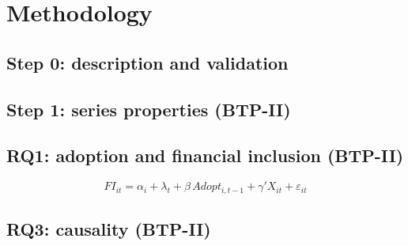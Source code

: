 \chapter{Methodology}\label{ch:methods}

\section{Step 0: description and validation}

\section{Step 1: series properties (BTP-II)}

\section{RQ1: adoption and financial inclusion (BTP-II)}
\begin{equation}
FI_{it} = \alpha_i + \lambda_t + \beta\, Adopt_{i,t-1} + \gamma' X_{it} + \varepsilon_{it}
\label{eq:fe}
\end{equation}

\section{RQ3: causality (BTP-II)}

